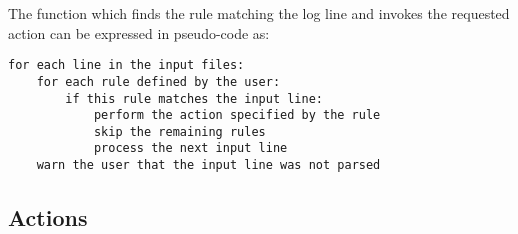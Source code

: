 \documentclass[draft]{svmult}
\begin{document}
The function which finds the rule matching the log line and invokes the
requested action can be expressed in pseudo-code as:


\begin{verbatim}
for each line in the input files: 
    for each rule defined by the user: 
        if this rule matches the input line:
            perform the action specified by the rule
            skip the remaining rules
            process the next input line
    warn the user that the input line was not parsed
\end{verbatim}

\subsection{Actions}

\label{Actions}
\end{document}

